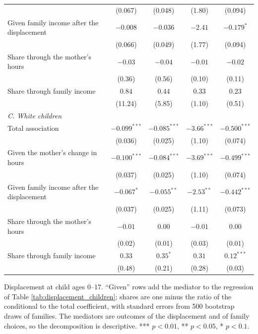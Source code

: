 \begin{table}[htbp]
{\begin{tabular}{lcccc}
 & (0.067) & (0.048) & (1.80) & (0.094) \\
Given family income after the displacement & $-0.008$ & $-0.036$ & $-2.41$ & $-0.179^{*}$ \\
 & (0.066) & (0.049) & (1.77) & (0.094) \\
Share through the mother's hours & $-0.03$ & $-0.04$ & $-0.01$ & $-0.02$ \\
 & (0.36) & (0.56) & (0.10) & (0.11) \\
Share through family income & $0.84$ & $0.44$ & $0.33$ & $0.23$ \\
 & (11.24) & (5.85) & (1.10) & (0.51) \\
\multicolumn{5}{l}{\textit{C. White children}} \\
Total association & $-0.099^{***}$ & $-0.085^{***}$ & $-3.66^{***}$ & $-0.500^{***}$ \\
 & (0.036) & (0.025) & (1.10) & (0.074) \\
Given the mother's change in hours & $-0.100^{***}$ & $-0.084^{***}$ & $-3.69^{***}$ & $-0.499^{***}$ \\
 & (0.037) & (0.025) & (1.10) & (0.074) \\
Given family income after the displacement & $-0.067^{*}$ & $-0.055^{**}$ & $-2.53^{**}$ & $-0.442^{***}$ \\
 & (0.037) & (0.025) & (1.11) & (0.073) \\
Share through the mother's hours & $-0.01$ & $0.00$ & $-0.01$ & $0.00$ \\
 & (0.02) & (0.01) & (0.03) & (0.01) \\
Share through family income & $0.33$ & $0.35^{*}$ & $0.31$ & $0.12^{***}$ \\
 & (0.48) & (0.21) & (0.28) & (0.03) \\
\bottomrule
\end{tabular}}
\begin{minipage}{0.95\textwidth}\footnotesize Displacement at child ages 0--17. ``Given'' rows add the mediator to the regression of Table \ref{tab:displacement_children}; shares are one minus the ratio of the conditional to the total coefficient, with standard errors from 500 bootstrap draws of families. The mediators are outcomes of the displacement and of family choices, so the decomposition is descriptive. *** $p<0.01$, ** $p<0.05$, * $p<0.1$.\end{minipage}
\end{table}
